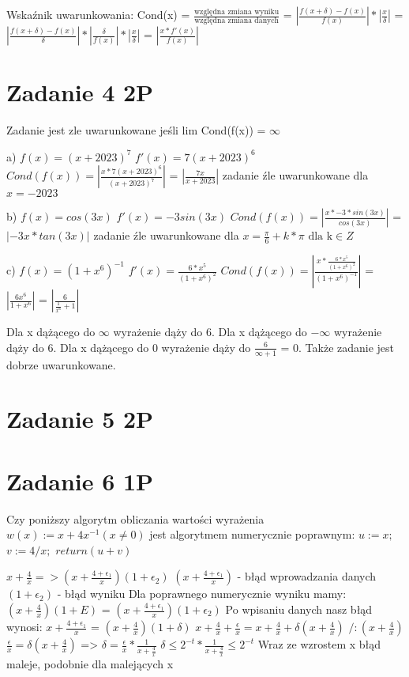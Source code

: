 \documentclass[12pt]{article}
\begin{document}
Wskaźnik uwarunkowania:
Cond(x) = $\frac{\text{względna zmiana wyniku}}{\text{względna zmiana danych}}$ = $|\frac{f(x + \delta) - f(x)}{f(x)}| * |\frac{x}{\delta}|$ = $|\frac{f(x+\delta) - f(x)}{\delta}| * |\frac{\delta}{f(x)}| * |\frac{x}{\delta}|$ = $|\frac{x*f'(x)}{f(x)}|$

\section{Zadanie 4 2P}
Zadanie jest zle uwarunkowane jeśli lim Cond(f(x)) = $\infty$

a) $f(x) = (x+2023)^7$
$f'(x) = 7(x+2023)^6$
$Cond(f(x)) = |\frac{x * 7(x+2023)^6}{(x+2023)^7}|$ = $|\frac{7x}{x+2023}|$
zadanie źle uwarunkowane dla $x = -2023$

b) $f(x)=cos(3x)$
$f'(x) = -3sin(3x)$
$Cond(f(x)) = |\frac{x * -3*sin(3x)}{cos(3x)}|$ = $|-3x * tan(3x)|$
zadanie źle uwarunkowane dla $x = \frac{\pi}{6} + k*\pi \text{ dla k} \in {Z}$

c) $f(x) = (1+x^6)^{-1}$
$f'(x) = \frac{6*x^5}{(1+x^6)^2}$
$Cond(f(x)) = |\frac{x * \frac{6*x^5}{(1+x^6)^2}}{(1+x^6)^{-1}}|$ = $|\frac{6x^6}{1+x^6}|$ = $|\frac{6}{\frac{1}{x^6} + 1}|$

Dla x dążącego do $\infty$ wyrażenie dąży do 6.
Dla x dążącego do $-\infty$ wyrażenie dąży do 6.
Dla x dążącego do 0 wyrażenie dąży do $\frac{6}{\infty+1}$ = 0.
Także zadanie jest dobrze uwarunkowane.

\section{Zadanie 5 2P}


\section{Zadanie 6 1P}
Czy poniższy algorytm obliczania wartości wyrażenia 
$w(x) := x + 4x^{-1} (x \neq 0)$ jest algorytmem numerycznie poprawnym:
$u:=x;$
$v:=4/x;$
$return(u+v)$

$x+\frac{4}{x} => (x+\frac{4+\epsilon_1}{x})(1+\epsilon_2)$
$(x+\frac{4+\epsilon_1}{x})$ - błąd wprowadzania danych
$(1+\epsilon_2)$ - błąd wyniku
Dla poprawnego numerycznie wyniku mamy:
$(x + \frac{4}{x})(1+E)$ = $(x+\frac{4+\epsilon_1}{x})(1+\epsilon_2)$
Po wpisaniu danych nasz błąd wynosi:
$x+\frac{4+\epsilon_1}{x}$ = $(x+\frac{4}{x})(1+\delta)$
$x + \frac{4}{x} + \frac{\epsilon}{x} = x + \frac{4}{x} + \delta(x+\frac{4}{x})$      $/:(x+\frac{4}{x})$   
$\frac{\epsilon}{x} = \delta(x+\frac{4}{x})$ => $\delta = \frac{\epsilon}{x} * \frac{1}{x+\frac{4}{x}}$
$\delta \leq 2^{-t} * \frac{1}{x+\frac{4}{x}} \leq 2^{-t}$
Wraz ze wzrostem x błąd maleje, podobnie dla malejących x
\end{document}
